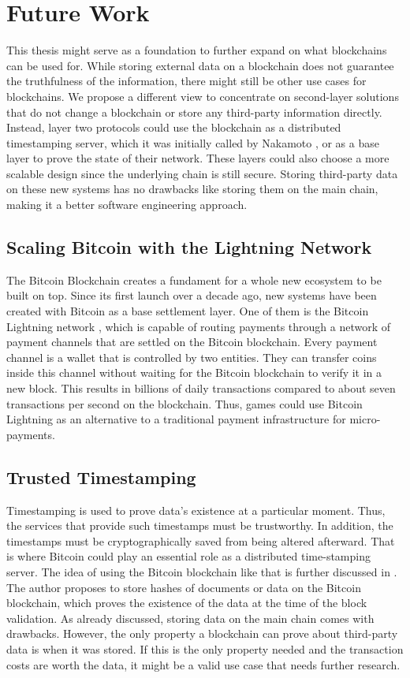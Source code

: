 \chapter{Future Work}

This thesis might serve as a foundation to further expand on what blockchains can be used for.
While storing external data on a blockchain does not guarantee the truthfulness of the information, there might still be other use cases for blockchains.
We propose a different view to concentrate on second-layer solutions that do not change a blockchain or store any third-party information directly.
Instead, layer two protocols could use the blockchain as a distributed timestamping server, which it was initially called by Nakamoto \cite{nakamoto2008}, or as a base layer to prove the state of their network.
These layers could also choose a more scalable design since the underlying chain is still secure.
Storing third-party data on these new systems has no drawbacks like storing them on the main chain, making it a better software engineering approach.

\section{Scaling Bitcoin with the Lightning Network}
The Bitcoin Blockchain creates a fundament for a whole new ecosystem to be built on top. 
Since its first launch over a decade ago, new systems have been created with Bitcoin as a base settlement layer.
One of them is the Bitcoin Lightning network \cite{poon2016}, which is capable of routing payments through a network of payment channels that are settled on the Bitcoin blockchain.
Every payment channel is a wallet that is controlled by two entities. 
They can transfer coins inside this channel without waiting for the Bitcoin blockchain to verify it in a new block. 
This results in billions of daily transactions compared to about seven transactions per second on the blockchain. 
Thus, games could use Bitcoin Lightning as an alternative to a traditional payment infrastructure for micro-payments.

\section{Trusted Timestamping}
Timestamping is used to prove data's existence at a particular moment.
Thus, the services that provide such timestamps must be trustworthy.
In addition, the timestamps must be cryptographically saved from being altered afterward.
That is where Bitcoin could play an essential role as a distributed time-stamping server.
The idea of using the Bitcoin blockchain like that is further discussed in \cite{timestamping}.
The author proposes to store hashes of documents or data on the Bitcoin blockchain, which proves the existence of the data at the time of the block validation.
As already discussed, storing data on the main chain comes with drawbacks.
However, the only property a blockchain can prove about third-party data is when it was stored.
If this is the only property needed and the transaction costs are worth the data, it might be a valid use case that needs further research.

